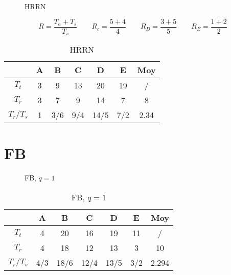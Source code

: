 \documentclass[a4, 11pt]{article}
\begin{document}
      \begin{figure}[h!]
         \centering
         
         \caption{HRRN}
         \label{fig:hrrn}
      \end{figure}
      \[\boxed{R = \frac{T_a + T_s}{T_s}} \qquad R_c = \frac{5+4}{4} \qquad R_D = \frac{3+5}{5} \qquad R_E = \frac{1+2}{2}\]

            \begin{table}[ht!]
         \centering
         \begin{tabular}{c|c|c|c|c|c|c}
            & \textbf{A} & \textbf{B} & \textbf{C} & \textbf{D} & \textbf{E} & \textbf{Moy} \\ \hline
            $T_t$   & 3 & 9  &   13 &   20   & 19 & / \\ \hline
            $T_r$   & 3  &7 &    9  &   14  &  7   &  8 \\ \hline
            $T_r / T_s$ & 1 & 3/6 &  9/4 &  14/5 & 7/2 &  2.34 \\
         \end{tabular}
         \caption{HRRN}
         \label{tab:hrrn}
      \end{table}

\newpage

   \section*{FB}

      \begin{figure}[h!]
         \centering
         
         \caption{FB, $q=1$}
         \label{fig:fbq1}
      \end{figure}

                  \begin{table}[ht!]
         \centering
         \begin{tabular}{c|c|c|c|c|c|c}
            & \textbf{A} & \textbf{B} & \textbf{C} & \textbf{D} & \textbf{E} & \textbf{Moy} \\ \hline
            $T_t$   & 4  &   20  &  16   & 19   & 11 & / \\ \hline
            $T_r$   & 4    & 18  &  12  &  13  &  3   &  10 \\ \hline
            $T_r / T_s$ & 4/3 &  18/6&  12/4 & 13/5  &3/2 &  2.294 \\
         \end{tabular}
         \caption{FB, $q=1$}
         \label{tab:fb1}
      \end{table}
\end{document}
